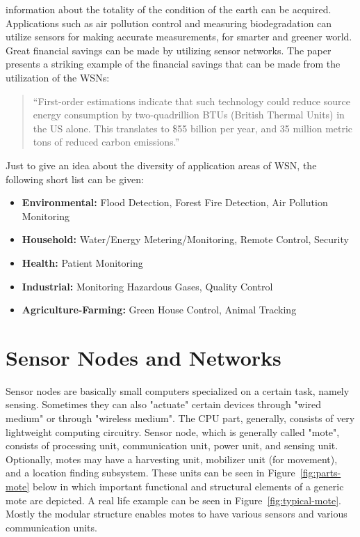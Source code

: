 \documentclass[12pt, oneandhalf, chaparabic, sees, ms]{metu}
\begin{document}
information about the totality of the condition of the
earth can be acquired. Applications such as air pollution
control and measuring biodegradation can utilize sensors for making accurate measurements, for smarter and
greener world. Great financial savings can be made by utilizing sensor networks. The paper~\cite{rabaey2000} presents a 
striking example of the financial savings that can be made from the utilization of the WSNs:
%
%
\begin{quote}
\enquote{First-order estimations indicate that such technology could reduce
source energy consumption by two-quadrillion BTUs (British
Thermal Units) in the US alone. This translates to \$55 billion per
year, and 35 million metric tons of reduced carbon emissions.}
\end{quote}
\vspace{-5mm}
%
Just to give an idea about the diversity of application areas of WSN, the following short list can be given:
%
\begin{itemize} 
\setlength{\itemsep}{0.5pt}
\item {\bf Environmental:} Flood Detection, Forest Fire Detection, Air Pollution Monitoring
\item {\bf Household:} Water/Energy Metering/Monitoring, Remote Control, Security
\item {\bf Health:} Patient Monitoring
\item {\bf Industrial:} Monitoring Hazardous Gases, Quality Control
\item {\bf Agriculture-Farming:} Green House Control, Animal Tracking
\end{itemize} 
% 
% 
%
%
\newpage
\section{Sensor Nodes and Networks}\label{snodes}
%
Sensor nodes are basically small computers specialized on a certain task, namely sensing. Sometimes they can also "actuate" certain devices
through "wired medium" or through "wireless medium". The CPU part, generally, consists of very lightweight computing circuitry. 
Sensor node, which is generally called "mote", consists of processing unit, communication unit, power unit, and sensing unit. Optionally, 
motes may have a harvesting unit, mobilizer unit (for movement), and a location finding subsystem. These units can be seen in Figure~\ref{fig:parts-mote} below
in which important functional and structural elements of a generic mote are depicted. A real life example can be seen in
Figure~\ref{fig:typical-mote}. Mostly the modular structure enables motes to have various sensors and various communication units.
%
\end{document}
